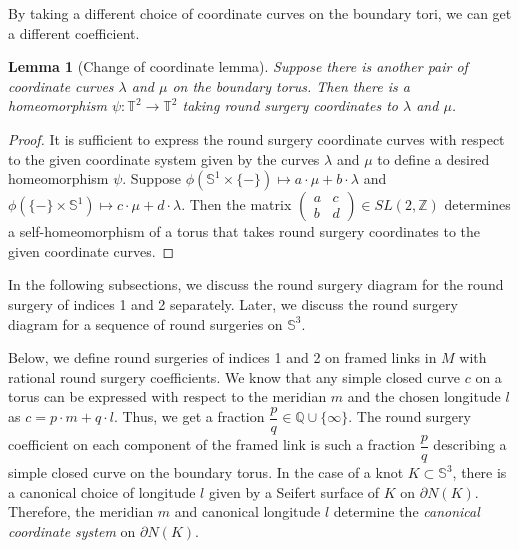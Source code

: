 \documentclass{amsart}
\theoremstyle{plain}
\newtheorem{lem}{Lemma}
\theoremstyle{remark}
\theoremstyle{definition}
\newcommand{\R}{\mathbb{R}}
\newcommand{\s}{\mathbb{S}}
\newcommand{\dd}{\partial}
\begin{document}
By taking a different choice of coordinate curves on the boundary tori, we can get a different coefficient. 

\begin{lem}[Change of coordinate lemma]
    Suppose there is another pair of coordinate curves $\lambda$ and $\mu$ on the boundary torus. Then there is a homeomorphism $\psi : \mathbb{T}^2 \to \mathbb{T}^2$ taking round surgery coordinates to $\lambda$ and $\mu$. 
\end{lem}
\begin{proof}
    It is sufficient to express the round surgery coordinate curves with respect to the given coordinate system given by the curves $\lambda$ and $\mu$ to define a desired homeomorphism $\psi$. Suppose $\phi(\s^1 \times \{-\})\mapsto a\cdot \mu + b \cdot \lambda$ and $\phi(\{-\} \times \s^1) \mapsto c \cdot \mu + d \cdot \lambda$. 
    Then the matrix $
    \begin{pmatrix}
        a & c \\
        b & d
    \end{pmatrix} \in SL(2, \mathbb{Z})$ determines a self-homeomorphism of a torus that takes round surgery coordinates to the given coordinate curves. 
\end{proof}




In the following subsections, we discuss the round surgery diagram for the round surgery of indices 1 and 2 separately. Later, we discuss the round surgery diagram for a sequence of round surgeries on $\s^3$. 
\fi 

Below, we define round surgeries of indices 1 and 2 on framed links in $M$ with rational round surgery coefficients. 
We know that any simple closed curve $c$ on a torus can be expressed with respect to the meridian $m$ and the chosen longitude $l$ as $c= p\cdot m + q \cdot l$. Thus, we get a fraction $\dfrac{p}{q} \in \mathbb{Q}\cup \{\infty\}$. 
The round surgery coefficient on each component of the framed link is such a fraction $\dfrac{p}{q}$ describing a simple closed curve on the boundary torus. 
In the case of a knot $K\subset \s^3$, there is a canonical choice of longitude $l$ given by a Seifert surface of $K$ on $\dd N(K)$.   
Therefore, the meridian $m$ and canonical longitude $l$ determine the \textit{canonical coordinate system} on $\dd N(K)$.  
\end{document}

